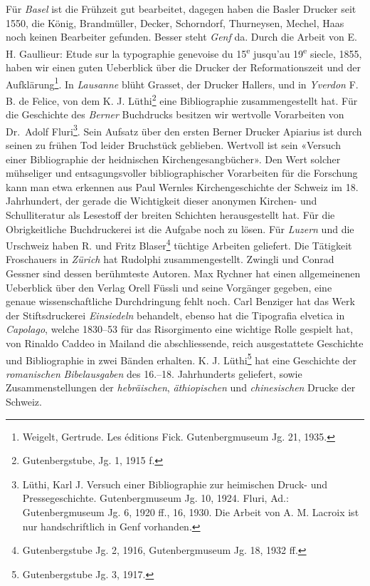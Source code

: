 \documentclass[a4paper,
fontsize=11pt,
oneside,
numbers=noperiodatend,
parskip=half-,
bibliography=totoc,
final
]{scrartcl}
\begin{document}
Für \emph{Basel} ist die Frühzeit gut bearbeitet, dagegen haben die
Basler Drucker seit 1550, die König, Brandmüller, Decker, Schorndorf,
Thurneysen, Mechel, Haas noch keinen Bearbeiter gefunden. Besser steht
\emph{Genf} da. Durch die Arbeit von E. H. Gaullieur: Etude sur la
typographie genevoise du 15\textsuperscript{e} jusqu'au
19\textsuperscript{e} siecle, 1855, haben wir einen guten Ueberblick
über die Drucker der Reformationszeit und der Aufklärung\footnote{Weigelt,
  Gertrude. Les éditions Fick. Gutenbergmuseum Jg. 21, 1935.}. In
\emph{Lausanne} blüht Grasset, der Drucker Hallers, und in
\emph{Yverdon} F. B. de Felice, von dem K. J. Lüthi\footnote{Gutenbergstube,
  Jg. 1, 1915 f.} eine Bibliographie zusammengestellt hat. Für die
Geschichte des \emph{Berner} Buchdrucks besitzen wir wertvolle
Vorarbeiten von Dr.~Adolf Fluri\footnote{Lüthi, Karl J. Versuch einer
  Bibliographie zur heimischen Druck- und Pressegeschichte.
  Gutenbergmuseum Jg. 10, 1924. Fluri, Ad.: Gutenbergmuseum Jg. 6, 1920
  ff., 16, 1930. Die Arbeit von A. M. Lacroix ist nur handschriftlich in
  Genf vorhanden.}. Sein Aufsatz über den ersten Berner Drucker Apiarius
ist durch seinen zu frühen Tod leider Bruchstück geblieben. Wertvoll ist
sein «Versuch einer Bibliographie der heidnischen Kirchengesangbücher».
Den Wert solcher mühseliger und entsagungsvoller bibliographischer
Vorarbeiten für die Forschung kann man etwa erkennen aus Paul Wernles
Kirchengeschichte der Schweiz im 18. Jahrhundert, der gerade die
Wichtigkeit dieser anonymen Kirchen- und Schulliteratur als Lesestoff
der breiten Schichten herausgestellt hat. Für die Obrigkeitliche
Buchdruckerei ist die Aufgabe noch zu lösen. Für \emph{Luzern} und die
Urschweiz haben R. und Fritz Blaser\footnote{Gutenbergstube Jg. 2, 1916,
  Gutenbergmuseum Jg. 18, 1932 ff.} tüchtige Arbeiten geliefert. Die
Tätigkeit Froschauers in \emph{Zürich} hat Rudolphi zusammengestellt.
Zwingli und Conrad Gessner sind dessen berühmteste Autoren. Max Rychner
hat einen allgemeinenen Ueberblick über den Verlag Orell Füssli und
seine Vorgänger gegeben, eine genaue wissenschaftliche Durchdringung
fehlt noch. Carl Benziger hat das Werk der Stiftsdruckerei
\emph{Einsiedeln} behandelt, ebenso hat die Tipografia elvetica in
\emph{Capolago}, welche 1830--53 für das Risorgimento eine wichtige
Rolle gespielt hat, von Rinaldo Caddeo in Mailand die abschliessende,
reich ausgestattete Geschichte und Bibliographie in zwei Bänden
erhalten. K. J. Lüthi\footnote{Gutenbergstube Jg. 3, 1917.} hat eine
Geschichte der \emph{romanischen} \emph{Bibelausgaben} des 16.--18.
Jahrhunderts geliefert, sowie Zusammenstellungen der \emph{hebräischen},
\emph{äthiopischen} und \emph{chinesischen} Drucke der Schweiz.
\end{document}

